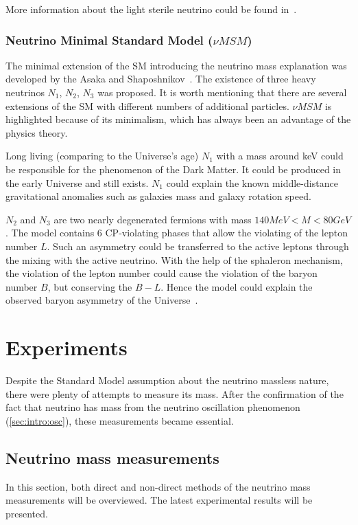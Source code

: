 \documentclass[../main.tex]{subfiles}
\begin{document}
More information about the light sterile neutrino could be found in~\cite{Abazajian2012}.

\subsubsection{Neutrino Minimal Standard Model ($\nu MSM$)}
\label{sec:intro:numsm}
The minimal extension of the SM introducing the neutrino mass explanation was developed by the Asaka and Shaposhnikov~\cite{Asaka2005}. The existence of three heavy neutrinos $N_1$, $N_2$, $N_3$ was proposed. It is worth mentioning that there are several extensions of the SM with different numbers of additional particles. $\nu MSM$ is highlighted because of its minimalism, which has always been an advantage of the physics theory.

Long living (comparing to the Universe's age) $N_1$ with a mass around keV could be responsible for the phenomenon of the Dark Matter. It could be produced in the early Universe and still exists. $N_1$ could explain the known middle-distance gravitational anomalies such as galaxies mass and galaxy rotation speed.

$N_2$ and $N_3$ are two nearly degenerated fermions with mass $140 MeV < M < 80 GeV$. The model contains 6 CP-violating phases that allow the violating of the lepton number $L$. Such an asymmetry could be transferred to the active leptons through the mixing with the active neutrino. With the help of the sphaleron mechanism, the violation of the lepton number could cause the violation of the baryon number $B$, but conserving the $B-L$. Hence the model could explain the observed baryon asymmetry of the Universe~\cite{Asaka2005a}.

\section{Experiments}
Despite the Standard Model assumption about the neutrino massless nature, there were plenty of attempts to measure its mass. After the confirmation of the fact that neutrino has mass from the neutrino oscillation phenomenon (\autoref{sec:intro:osc}), these measurements became essential.

\subsection{Neutrino mass measurements}
In this section, both direct and non-direct methods of the neutrino mass measurements will be overviewed. The latest experimental results will be presented.
\end{document}
